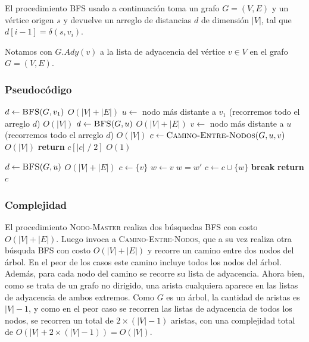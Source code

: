 \documentclass[a4paper, 10pt, twoside]{article}
\newenvironment{pseudo}[1][]{%
    \vspace{1em}%
    \begin{algorithmic}%
}
{%
    \end{algorithmic}%
    \vspace{1em}%
}
\newcommand{\In}{\textbf{in} }
\newcommand{\Break}{\State \textbf{break}}
\newcommand{\PReturn}{\State \textbf{return} }
\newcommand{\Ode}[1]{\hfill $O(#1)$}
\begin{document}
El procedimiento BFS usado a continuación toma un grafo $G = (V, E)$ y un vértice origen $s$ y devuelve un arreglo de distancias $d$ de dimensión $|V|$, tal que $d[i - 1] = \delta(s, v_i)$.

Notamos con $G.Ady(v)$ a la lista de adyacencia del vértice $v \in V$ en el grafo $G = (V, E)$.


\subsubsection{Pseudocódigo}

\begin{pseudo}
    \State $d \leftarrow \textsc{BFS}(G, v_1)$                                         \Ode{|V| + |E|}
    \State $u \leftarrow$ nodo más distante a $v_1$ (recorremos todo el arreglo $d$)   \Ode{|V|}
    \State $d \leftarrow \textsc{BFS}(G, u)$                                           \Ode{|V| + |E|}
    \State $v \leftarrow$ nodo más distante a $u$ (recorremos todo el arreglo $d$)     \Ode{|V|}
    \State $c \leftarrow \textsc{Camino-Entre-Nodos}(G, u, v)$                         \Ode{|V|}
    \PReturn $c[|c|\; /\; 2]$                                                          \Ode{1}
  \EndProcedure

  \State

    \State $d \leftarrow \textsc{BFS}(G, u)$                                           \Ode{|V| + |E|}
    \State $c \leftarrow \{ v \}$ 
    \State $w \leftarrow v$ 
     
      \For{$w'$ \In $G.Ady(w)$} 
         
          \State $w = w'$
          \State $c \leftarrow c \cup \{ w \}$ 
          \Break
        \EndIf
      \EndFor
    \EndWhile
    \PReturn $c$
  \EndProcedure
\end{pseudo}


\subsubsection{Complejidad}

El procedimiento \textsc{Nodo-Master} realiza dos búsquedas BFS con costo $O(|V| + |E|)$. Luego invoca a \textsc{Camino-Entre-Nodos}, que a su vez realiza otra búsquda BFS con costo $O(|V| + |E|)$ y recorre un camino entre dos nodos del árbol. En el peor de los casos este camino incluye todos los nodos del árbol. Además, para cada nodo del camino se recorre su lista de adyacencia. Ahora bien, como se trata de un grafo no dirigido, una arista cualquiera aparece en las listas de adyacencia de ambos extremos. Como $G$ es un árbol, la cantidad de aristas es $|V| - 1$, y como en el peor caso se recorren las listas de adyacencia de todos los nodos, se recorren un total de $2 \times (|V| - 1)$ aristas, con una complejidad total de $O(|V| + 2 \times (|V| - 1)) = O(|V|)$.
\end{document}
